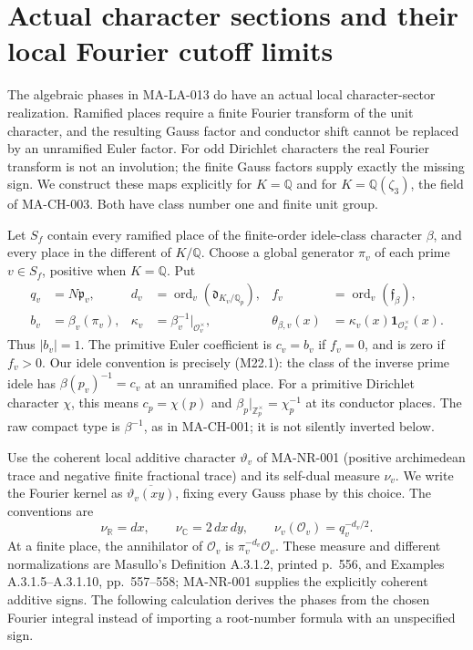\section{Actual character sections and their local Fourier cutoff limits}
\label{sec:character-quotient-repair}

The algebraic phases in MA-LA-013 do have an actual local
character-sector realization.  Ramified places require a
finite Fourier transform of the unit character, and the
resulting Gauss factor and conductor shift cannot be
replaced by an unramified Euler factor.  For odd Dirichlet
characters the real Fourier transform is not an involution;
the finite Gauss factors supply exactly the missing sign.
We construct these maps explicitly for $K=\mathbb Q$ and
for $K=\mathbb Q(\zeta_3)$, the field of MA-CH-003.
Both have class number one and finite unit group.

Let $S_f$ contain every ramified place of the finite-order
idele-class character $\beta$, and every place in the
different of $K/\mathbb Q$.  Choose a global generator
$\pi_v$ of each prime $v\in S_f$, positive when $K=\mathbb Q$.
Put
\[
\begin{aligned}
 q_v&=N\mathfrak p_v,&
 d_v&=\operatorname{ord}_v(\mathfrak d_{K_v/\mathbb Q_p}),&
 f_v&=\operatorname{ord}_v(\mathfrak f_\beta),\\
 b_v&=\beta_v(\pi_v),&
 \kappa_v&=\beta_v^{-1}|_{\mathcal O_v^\times},&
 \theta_{\beta,v}(x)&=\kappa_v(x)\mathbf1_{\mathcal O_v^\times}(x).
\end{aligned}
\tag{MA-CQ.1}
\]
Thus $|b_v|=1$.  The primitive Euler coefficient is
$c_v=b_v$ if $f_v=0$, and is zero if $f_v>0$.
Our idele convention is precisely (M22.1): the class of
the inverse prime idele has $\beta(p_v)^{-1}=c_v$ at an
unramified place.  For a primitive Dirichlet character
$\chi$, this means $c_p=\chi(p)$ and
$\beta_p|_{\mathbb Z_p^\times}=\chi_p^{-1}$ at its
conductor places.  The raw compact type is $\beta^{-1}$,
as in MA-CH-001; it is not silently inverted below.

Use the coherent local additive character $\vartheta_v$ of
MA-NR-001 (positive archimedean trace and negative finite
fractional trace) and its self-dual measure $\nu_v$.  We write the Fourier kernel as
$\overline{\vartheta_v(xy)}$, fixing every Gauss phase by this
choice.  The conventions are
\[
 \nu_{\mathbb R}=dx,\qquad
 \nu_{\mathbb C}=2\,dx\,dy,\qquad
 \nu_v(\mathcal O_v)=q_v^{-d_v/2}.
\tag{MA-CQ.2}
\]
At a finite place, the annihilator of $\mathcal O_v$ is
$\pi_v^{-d_v}\mathcal O_v$.
These measure and different normalizations are Masullo's
Definition A.3.1.2, printed p.~556, and Examples
A.3.1.5--A.3.1.10, pp.~557--558; MA-NR-001 supplies
the explicitly coherent additive signs.
The following calculation derives the phases from the
chosen Fourier integral instead of importing a root-number
formula with an unspecified sign.

